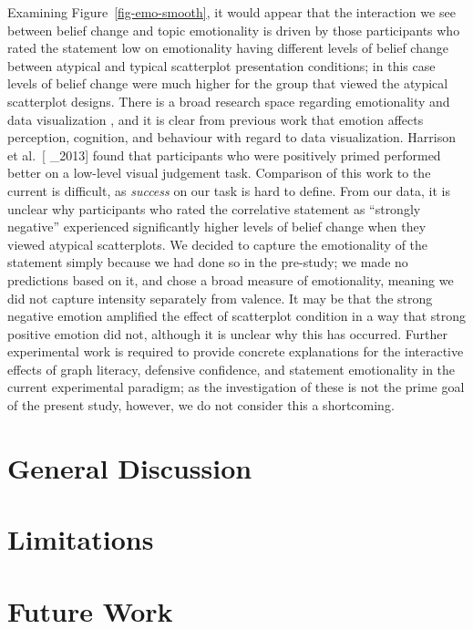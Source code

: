 \documentclass[manuscript,screen,review]{acmart}
\begin{document}
Examining Figure~\ref{fig-emo-smooth}, it would appear that the
interaction we see between belief change and topic emotionality is
driven by those participants who rated the statement low on emotionality
having different levels of belief change between atypical and typical
scatterplot presentation conditions; in this case levels of belief
change were much higher for the group that viewed the atypical
scatterplot designs. There is a broad research space regarding
emotionality and data visualization \citep{lan_2023}, and it is clear
from previous work that emotion affects perception, cognition, and
behaviour \citep[probably look for more]{phelps_2006, harrison_2013}
with regard to data visualization. Harrison et al.~{[}\citet{harrison}
\_2013{]} found that participants who were positively primed performed
better on a low-level visual judgement task. Comparison of this work to
the current is difficult, as \emph{success} on our task is hard to
define. From our data, it is unclear why participants who rated the
correlative statement as ``strongly negative'' experienced significantly
higher levels of belief change when they viewed atypical scatterplots.
We decided to capture the emotionality of the statement simply because
we had done so in the pre-study; we made no predictions based on it, and
chose a broad measure of emotionality, meaning we did not capture
intensity separately from valence. It may be that the strong negative
emotion amplified the effect of scatterplot condition in a way that
strong positive emotion did not, although it is unclear why this has
occurred. Further experimental work is required to provide concrete
explanations for the interactive effects of graph literacy, defensive
confidence, and statement emotionality in the current experimental
paradigm; as the investigation of these is not the prime goal of the
present study, however, we do not consider this a shortcoming.

\section{General Discussion}\label{general-discussion}

\section{Limitations}\label{limitations}

\section{Future Work}\label{future-work}
\end{document}
